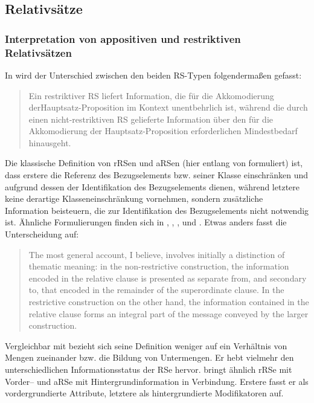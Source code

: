 \subsection{Relativsätze}
\label{sec:rs}
\subsubsection{Interpretation von appositiven und restriktiven Relativsätzen}
\label{sec:interrs}
In \citet[15]{Bluehdorn2007} wird der Unterschied zwischen den beiden RS-Typen folgendermaßen gefasst: 

\begin{quotation}
Ein restriktiver RS liefert Information, die für die Akkomodierung der\linebreak Hauptsatz-Proposition im Kontext unentbehrlich ist, während die durch einen nicht-restriktiven RS gelieferte Information über den für die Akkomodierung der Hauptsatz-Proposition erforderlichen Mindestbedarf hinausgeht.
\end{quotation}
Die klassische Definition von rRSen und aRSen (hier entlang von \citealt[193]{Schaffranietz1997} formuliert) ist, dass erstere die Referenz des Bezugselements bzw. seiner Klasse einschränken und aufgrund dessen der Identifikation des Bezugselements dienen, während letztere keine derartige Klasseneinschränkung vornehmen, sondern zusätzliche Information beisteuern, die zur Identifikation des Bezugselements nicht notwendig ist. Ähnliche Formulierungen finden sich in \citet[12--13]{Buscha1983}, \citet[268--272]{Eisenberg2004}, \citet[18, 32]{Birkner2008}, \citet[42]{Zifonun1997} und \citet[99--100]{Fritsch1990}.  Etwas anders fasst \citet[399]{Huddleston1984} die Unterscheidung auf: 

\begin{quotation}
The most general account, I believe, involves initially a distinction of thematic meaning: in the non-restrictive construction, the information encoded in the relative clause is presented as separate from, and secondary to, that encoded in the remainder of the superordinate clause. In the restrictive construction on the other hand, the information contained in the relative clause forms an integral part of the message conveyed by the larger construction.
\end{quotation}
Vergleichbar mit \citet{Bluehdorn2007} bezieht sich seine Definition weniger auf ein Verhältnis von Mengen zueinander bzw. die Bildung von Untermengen. Er hebt vielmehr den unterschiedlichen Informationsstatus der RSe hervor. \citet[85--86]{Abraham2012} bringt ähnlich rRSe mit Vorder– und aRSe mit Hintergrundinformation in Verbindung. Erstere fasst er als vordergrundierte Attribute, letztere als hintergrundierte Modifikatoren auf.

